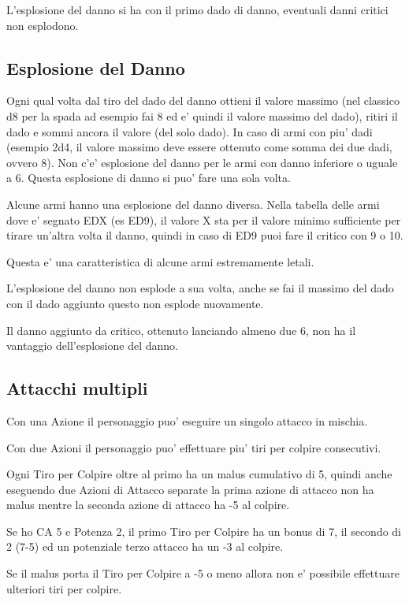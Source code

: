 \documentclass[a4paper,11pt,twoside,openany]{book}
\begin{document}
	L'esplosione del danno si ha con il primo dado di danno, eventuali danni critici non esplodono.
	
	\subsection{Esplosione del Danno}
	
	Ogni qual volta dal tiro del dado del danno ottieni il valore massimo (nel classico d8 per la spada ad esempio fai 8 ed e' quindi il valore massimo del dado), ritiri il dado e sommi ancora il valore (del solo dado). In caso di armi con piu' dadi (esempio 2d4, il valore massimo deve essere ottenuto come somma dei due dadi, ovvero 8). Non c'e' esplosione del danno per le armi con danno inferiore o uguale a 6. Questa esplosione di danno si puo' fare una sola volta.
	
	Alcune armi hanno una esplosione del danno diversa. Nella tabella delle armi dove e' segnato EDX (es ED9), il valore X sta per il valore minimo sufficiente per tirare un'altra volta il danno, quindi in caso di ED9 puoi fare il critico con 9 o 10.
	
	Questa e' una caratteristica di alcune armi estremamente letali.
	
	L'esplosione del danno non esplode a sua volta, anche se fai il massimo del dado con il dado aggiunto questo non esplode nuovamente.
	
	Il danno aggiunto da critico, ottenuto lanciando almeno due 6, non ha il vantaggio dell'esplosione del danno.
	
	\subsection{Attacchi multipli}
	
	Con una Azione il personaggio puo' eseguire un singolo attacco in mischia.
	
	Con due Azioni il personaggio puo' effettuare piu' tiri per colpire consecutivi.
	
	Ogni Tiro per Colpire oltre al primo ha un malus cumulativo di 5, quindi anche eseguendo due Azioni di Attacco separate la prima azione di attacco non ha malus mentre la seconda azione di attacco ha -5 al colpire.
	
	Se ho CA 5 e Potenza 2, il primo Tiro per Colpire ha un bonus di 7, il secondo di 2 (7-5) ed un potenziale terzo attacco ha un -3 al colpire.
	
	Se il malus porta il Tiro per Colpire a -5 o meno allora non e' possibile effettuare ulteriori tiri per colpire.
	
\end{document}
